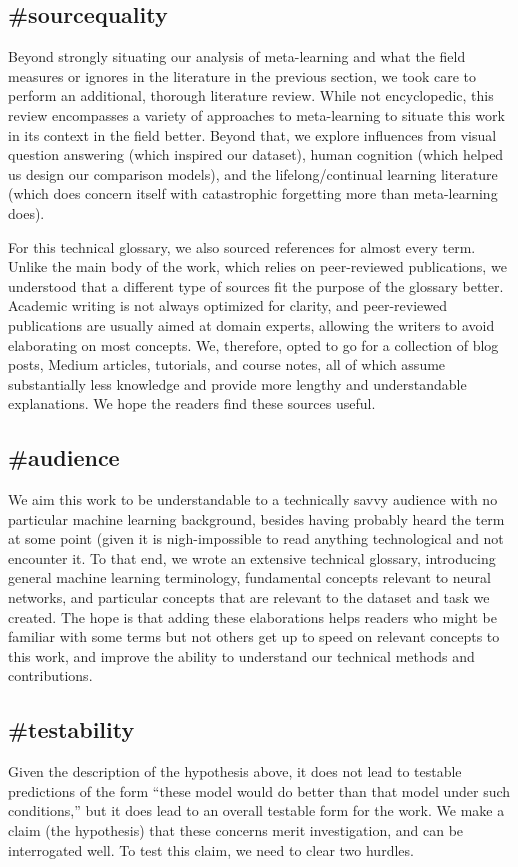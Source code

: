 \subsection{\#sourcequality}
Beyond strongly situating our analysis of meta-learning and what the field measures or ignores in the literature in the previous section, we took care to perform an additional, thorough literature review. While not encyclopedic, this review encompasses a variety of approaches to meta-learning to situate this work in its context in the field better. Beyond that, we explore influences from visual question answering (which inspired our dataset), human cognition (which helped us design our comparison models), and the lifelong/continual learning literature (which does concern itself with catastrophic forgetting more than meta-learning does).

For this technical glossary, we also sourced references for almost every term. Unlike the main body of the work, which relies on peer-reviewed publications, we understood that a different type of sources fit the purpose of the glossary better. Academic writing is not always optimized for clarity, and peer-reviewed publications are usually aimed at domain experts, allowing the writers to avoid elaborating on most concepts. We, therefore, opted to go for a collection of blog posts, Medium articles, tutorials, and course notes, all of which assume substantially less knowledge and provide more lengthy and understandable explanations. We hope the readers find these sources useful.

\subsection{\#audience}
We aim this work to be understandable to a technically savvy audience with no particular machine learning background, besides having probably heard the term at some point (given it is nigh-impossible to read anything technological and not encounter it. To that end, we wrote an extensive technical glossary, introducing general machine learning terminology, fundamental concepts relevant to neural networks, and particular concepts that are relevant to the dataset and task we created. The hope is that adding these elaborations helps readers who might be familiar with some terms but not others get up to speed on relevant concepts to this work, and improve the ability to understand our technical methods and contributions.

\subsection{\#testability}
Given the description of the hypothesis above, it does not lead to testable predictions of the form “these model would do better than that model under such conditions,” but it does lead to an overall testable form for the work. We make a claim (the hypothesis) that these concerns merit investigation, and can be interrogated well. To test this claim, we need to clear two hurdles. 

